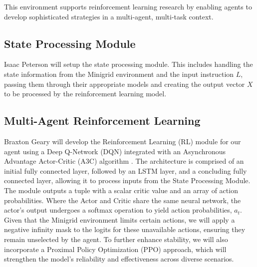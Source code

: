 \documentclass[11pt]{article}
\begin{document}
This environment supports reinforcement learning research by enabling agents to develop sophisticated strategies in a multi-agent, multi-task context.


\subsection{State Processing Module}
Isaac Peterson will setup the state processing module. This includes handling the state information from the Minigrid environment and the input instruction $L$, passing them through their appropriate models and creating the output vector $X$ to be processed by the reinforcement learning model. 

\subsection{Multi-Agent Reinforcement Learning}

Braxton Geary will develop the Reinforcement Learning (RL) module for our agent using a Deep Q-Network (DQN) integrated with an 
Asynchronous Advantage Actor-Critic (A3C) algorithm \cite{Mnih2016}. The architecture is comprised of an initial fully connected layer, followed by an LSTM layer, 
and a concluding fully connected layer, allowing it to process inputs from the State Processing Module. The module outputs a tuple with a scalar 
critic value and an array of action probabilities. Where the Actor and Critic share the same neural network, the actor's output undergoes a softmax operation 
to yield action probabilities, \( a_t \). Given that the Minigrid environment limits certain actions, we will apply a negative infinity mask to the logits for 
these unavailable actions, ensuring they remain unselected by the agent. To further enhance stability, we will also incorporate a Proximal Policy Optimization (PPO) 
approach, which will strengthen the model's reliability and effectiveness across diverse scenarios.

% 


\end{document}
